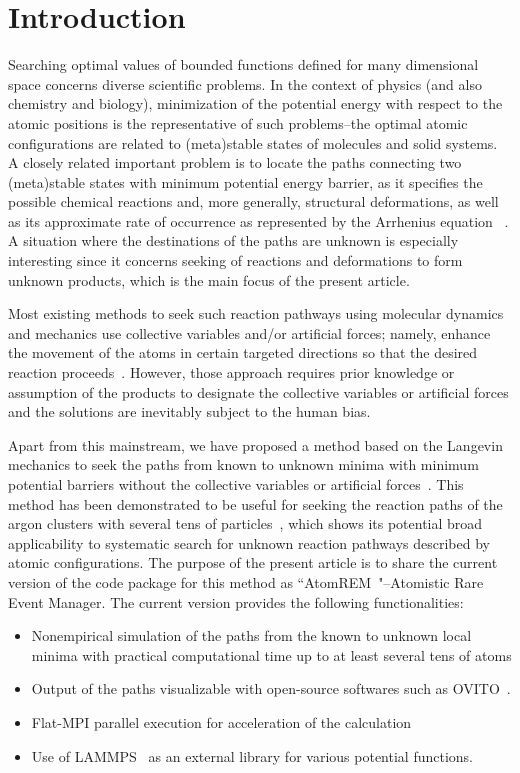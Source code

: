 \documentclass[preprint,12pt]{elsarticle}
\begin{document}
\section{Introduction}
Searching optimal values of bounded functions defined for many dimensional space concerns diverse scientific problems. In the context of physics (and also chemistry and biology), minimization of the potential energy with respect to the atomic positions is the representative of such problems--the optimal atomic configurations are related to (meta)stable states of molecules and solid systems. A closely related important problem is to locate the paths connecting two (meta)stable states with minimum potential energy barrier, as it specifies the possible chemical reactions and, more generally, structural deformations, as well as its approximate rate of 
occurrence as represented by the Arrhenius equation~\cite{Laidler-text} . A situation where the destinations of the paths are unknown is especially interesting since it concerns seeking of reactions and deformations to form unknown products, which is the main focus of the present article.

Most existing methods to seek such reaction pathways using molecular dynamics and mechanics use collective variables and/or artificial forces; namely, enhance the movement of the atoms in certain targeted directions so that the desired reaction proceeds~\cite{Carter-Ciccotti-bluemoon,Sprik-Ciccotti-bluemoon,Schlitter-Wollmer-targetedMD,SteeredMD-orig-Sci1996,Voter-hyperdyn-JCP1997,Voter-hyperdyn-PRL1997,Laio01102002,Darve-ABF-JCP2001}. However, those approach requires prior knowledge or assumption of the products to designate the collective variables or artificial forces and the solutions are inevitably subject to the human bias.
  
Apart from this mainstream, we have proposed a method based on the Langevin mechanics to seek the paths from known to unknown minima with minimum potential barriers without the collective variables or artificial forces~\cite{Akashi}. This method has been demonstrated to be useful for seeking the reaction paths of the argon clusters with several tens of particles~\cite{Nagornov}, which shows its potential broad applicability to systematic search for unknown reaction pathways described by atomic configurations. The purpose of the present article is to share the current version of the code package for this method as ``AtomREM~\cite{AtomREM}"--Atomistic Rare Event Manager. The current version provides the following functionalities:
\begin{itemize}
\item Nonempirical simulation of the paths from the known to unknown local minima with practical computational time up to at least several tens of atoms
\item Output of the paths visualizable with open-source softwares such as OVITO~\cite{Stukowski_2009,OVITO}.
\item Flat-MPI parallel execution for acceleration of the calculation
\item Use of LAMMPS~\cite{LAMMPS} as an external library for various potential functions.
\end{itemize}
\end{document}
